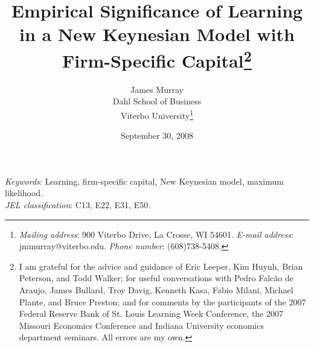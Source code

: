 \documentclass[12pt]{article}
\begin{document}
\begin{titlepage}
\begin{singlespace}
\title{Empirical Significance of Learning in a New Keynesian Model with Firm-Specific Capital\footnote{I am grateful for the advice and guidance of Eric Leeper, Kim Huynh, Brian Peterson, and Todd Walker; for useful conversations with Pedro Falc\~{a}o de Araujo, James Bullard, Troy Davig, Kenneth Kasa, Fabio Milani, Michael Plante, and Bruce Preston; and for comments by the participants of the 2007 Federal Reserve Bank of St. Louis Learning Week Conference, the 2007 Missouri Economics Conference and Indiana University economics department seminars.  All errors are my own.}}
\date{September 30, 2008}
\author{James Murray\\
Dahl School of Business\\
Viterbo University\footnote{\textit{Mailing address}: 900 Viterbo Drive, La Crosse, WI  54601. \textit{E-mail address}: jmmurray@viterbo.edu.  \textit{Phone number}: (608)738-5408. }}

\maketitle

\thispagestyle{empty}

\abstract{} \newline 

\noindent \textit{Keywords}: Learning, firm-specific capital, New Keynesian model, maximum likelihood. \\
\noindent \textit{JEL classification}: C13, E22, E31, E50.
\end{singlespace}
\end{titlepage}
\newpage


\newpage

\newpage


\end{document}
